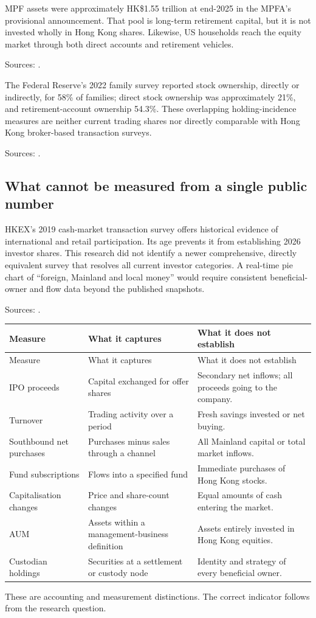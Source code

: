 \documentclass[11pt,a4paper]{article}
\newcommand{\source}[1]{\par{\footnotesize\color{ink}Sources: \cite{#1}.}\par}
\begin{document}
MPF assets were approximately HK\$1.55 trillion at end-2025 in the MPFA's provisional announcement. That pool is long-term retirement capital, but it is not invested wholly in Hong Kong shares. Likewise, US households reach the equity market through both direct accounts and retirement vehicles.\source{mpf}

The Federal Reserve's 2022 family survey reported stock ownership, directly or indirectly, for 58\% of families; direct stock ownership was approximately 21\%, and retirement-account ownership 54.3\%. These overlapping holding-incidence measures are neither current trading shares nor directly comparable with Hong Kong broker-based transaction surveys.\source{fedscf}

\subsection{What cannot be measured from a single public number}
HKEX's 2019 cash-market transaction survey offers historical evidence of international and retail participation. Its age prevents it from establishing 2026 investor shares. This research did not identify a newer comprehensive, directly equivalent survey that resolves all current investor categories. A real-time pie chart of ``foreign, Mainland and local money'' would require consistent beneficial-owner and flow data beyond the published snapshots.\source{transactionsurvey}

\begin{longtable}{@{}L{3.7cm}L{5.5cm}L{6.3cm}@{}}
\toprule Measure & What it captures & What it does not establish\\\midrule\endfirsthead
\toprule Measure & What it captures & What it does not establish\\\midrule\endhead
IPO proceeds & Capital exchanged for offer shares & Secondary net inflows; all proceeds going to the company.\\
Turnover & Trading activity over a period & Fresh savings invested or net buying.\\
Southbound net purchases & Purchases minus sales through a channel & All Mainland capital or total market inflows.\\
Fund subscriptions & Flows into a specified fund & Immediate purchases of Hong Kong stocks.\\
Capitalisation changes & Price and share-count changes & Equal amounts of cash entering the market.\\
AUM & Assets within a management-business definition & Assets entirely invested in Hong Kong equities.\\
Custodian holdings & Securities at a settlement or custody node & Identity and strategy of every beneficial owner.\\
\bottomrule
\end{longtable}
These are accounting and measurement distinctions. The correct indicator follows from the research question.
\end{document}
